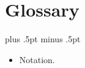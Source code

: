 \chapter*{Glossary}
\pagestyle{plain}
\baselineskip=12pt plus .5pt minus .5pt

\begin{itemize}
  \item Notation.
\end{itemize}

